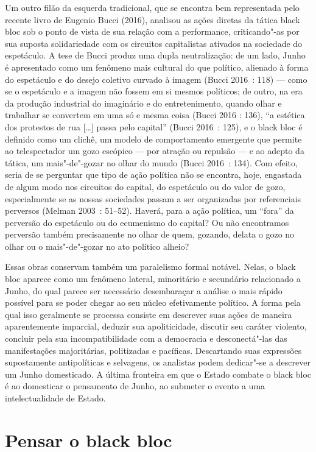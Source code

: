 Um outro filão da esquerda tradicional, que se encontra bem representada
pelo recente livro de Eugenio Bucci (2016), analisou as ações diretas da
tática black bloc sob o ponto de vista de sua relação com a performance,
criticando"-as por sua suposta solidariedade com os circuitos
capitalistas ativados na sociedade do espetáculo. A tese de Bucci produz
uma dupla neutralização: de um lado, Junho é apresentado como um
fenômeno mais cultural do que político, alienado à forma do espetáculo e
do desejo coletivo curvado à imagem (Bucci 2016~: 118) --- como se o
espetáculo e a imagem não fossem em si mesmos políticos; de outro, na
era da produção industrial do imaginário e do entretenimento, quando
olhar e trabalhar se convertem em uma só e mesma coisa (Bucci 2016 :
136), ``a estética dos protestos de rua {[}\ldots{}{]} passa pelo
capital'' (Bucci 2016~: 125), e o black bloc é definido como um clichê,
um modelo de comportamento emergente que permite ao telespectador um
gozo escópico --- por atração ou repulsão --- e ao adepto da tática, um
mais"-de"-gozar no olhar do mundo (Bucci 2016~: 134). Com efeito, seria de
se perguntar que tipo de ação política não se encontra, hoje, engastada
de algum modo nos circuitos do capital, do espetáculo ou do valor de
gozo, especialmente se as nossas sociedades passam a ser organizadas por
referenciais perversos (Melman 2003~: 51--52). Haverá, para a ação
política, um ``fora'' da perversão do espetáculo ou do ecumenismo do
capital? Ou não encontramos perversão também precisamente no olhar de
quem, gozando, delata o gozo no olhar ou o mais"-de"-gozar no ato político
alheio?

Essas obras conservam também um paralelismo formal notável. Nelas, o
black bloc aparece como um fenômeno lateral, minoritário e secundário
relacionado a Junho, do qual parece ser necessário desembaraçar a
análise o mais rápido possível para se poder chegar ao seu núcleo
efetivamente político. A forma pela qual isso geralmente se processa
consiste em descrever suas ações de maneira aparentemente imparcial,
deduzir sua apoliticidade, discutir seu caráter violento, concluir pela
sua incompatibilidade com a democracia e desconectá"-las das
manifestações majoritárias, politizadas e pacíficas. Descartando suas
expressões supostamente antipolíticas e selvagens, os analistas podem
dedicar"-se a descrever um Junho domesticado. A última fronteira em que o
Estado combate o black bloc é ao domesticar o pensamento de Junho, ao
submeter o evento a uma intelectualidade de Estado.

\section{Pensar o black bloc}

